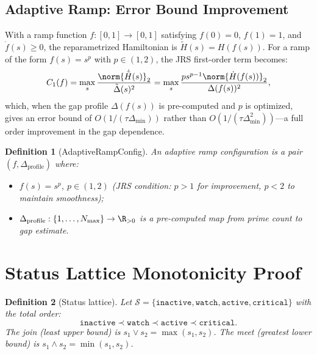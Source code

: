 \documentclass[11pt,letterpaper]{article}
\theoremstyle{pirtmthm}
\newtheorem{definition}{Definition}[section]
\theoremstyle{remark}
\begin{document}
\subsection{Adaptive Ramp: Error Bound Improvement}
\label{sec:adaptive-ramp}

With a ramp function $f : [0,1] \to [0,1]$ satisfying
$f(0) = 0$, $f(1) = 1$, and $\dot{f}(s) \geq 0$, the reparametrized
Hamiltonian is $\tilde{H}(s) = H(f(s))$. For a ramp of the form
$f(s) = s^p$ with $p \in (1,2)$, the JRS first-order term becomes:
\[
  C_1(f) = \max_s \frac{\norm{\dot{\tilde{H}}(s)}_2}{\tilde\Delta(s)^2}
  = \max_s \frac{p s^{p-1} \norm{\dot{H}(f(s))}_2}{\Delta(f(s))^2},
\]
which, when the gap profile $\Delta(f(s))$ is pre-computed and $p$
is optimized, gives an error bound of $O(1/(\tau\Delta_{\min}))$ rather
than $O(1/(\tau\Delta_{\min}^2))$---a full order improvement in the
gap dependence.

\begin{definition}[AdaptiveRampConfig]
\label{def:A-ramp-config}
An \emph{adaptive ramp configuration} is a pair $(f, \Delta_\text{profile})$
where:
\begin{itemize}
  \item $f(s) = s^p$, $p \in (1,2)$ (JRS condition: $p > 1$ for improvement,
    $p < 2$ to maintain smoothness);
  \item $\Delta_\text{profile} : \{1,\ldots,N_\text{max}\} \to \R_{>0}$
    is a pre-computed map from prime count to gap estimate.
\end{itemize}
\end{definition}

\section{Status Lattice Monotonicity Proof}
\label{sec:lattice}

\begin{definition}[Status lattice]
\label{def:A-lattice}
Let $\mathcal{S} = \{\texttt{inactive}, \texttt{watch}, \texttt{active},
\texttt{critical}\}$ with the total order:
\[
  \texttt{inactive} \prec \texttt{watch} \prec \texttt{active}
  \prec \texttt{critical}.
\]
The join (least upper bound) is $s_1 \vee s_2 = \max(s_1, s_2)$.
The meet (greatest lower bound) is $s_1 \wedge s_2 = \min(s_1, s_2)$.
\end{definition}
\end{document}
